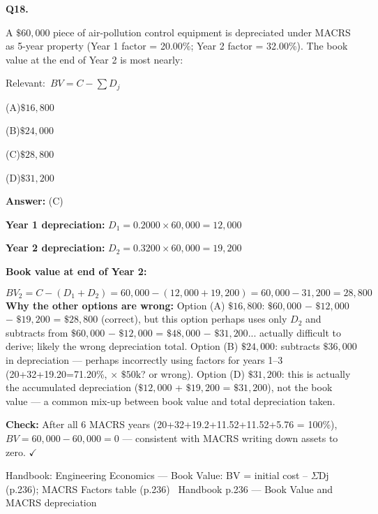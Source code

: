 \documentclass[11pt]{article}
\newcommand{\correct}[1]{\textbf{#1}\;{\color{accent}$\checkmark$}}
\newcommand{\optline}[2]{\par\noindent\hspace{1.2em}(#1)\hspace{0.6em}#2}
\begin{document}
\vspace{9pt}
\filbreak
\textbf{\color{accent}Q18.}\par\vspace{2pt}
A $\$60{,}000$ piece of air-pollution control equipment is depreciated under MACRS as 5-year property (Year 1 factor = 20.00\%; Year 2 factor = 32.00\%). The book value at the end of Year 2 is most nearly:\par\par\vspace{3pt}
{\small\color{soft}Relevant:}\ $BV = C - \sum D_j$\par\vspace{3pt}
\optline{A}{$\$16{,}800$}
\optline{B}{$\$24{,}000$}
\optline{C}{\correct{$\$28{,}800$}}
\optline{D}{$\$31{,}200$}
\par\vspace{3pt}
\vspace{2pt}\par\noindent\colorbox{boxbg}{\parbox{\dimexpr\linewidth-2\fboxsep\relax}{%
\vspace{2pt}\textbf{Answer:} (C)\par\vspace{2pt}
{\small \textbf{Year 1 depreciation:} $D_1 = 0.2000 \times 60{,}000 = 12{,}000$\par
\textbf{Year 2 depreciation:} $D_2 = 0.3200 \times 60{,}000 = 19{,}200$\par
\textbf{Book value at end of Year 2:}\par
\[BV_2 = C - (D_1 + D_2) = 60{,}000 - (12{,}000 + 19{,}200) = 60{,}000 - 31{,}200 = 28{,}800\]
\textbf{Why the other options are wrong:} Option (A) $\$16{,}800$: $\$60{,}000$ $-$ $\$12{,}000$ $-$ $\$19{,}200$ = $\$28{,}800$ (correct), but this option perhaps uses only $D_2$ and subtracts from $\$60{,}000$ $-$ $\$12{,}000$ = $\$48{,}000$ $-$ $\$31{,}200$... actually difficult to derive; likely the wrong depreciation total. Option (B) $\$24{,}000$: subtracts $\$36{,}000$ in depreciation --- perhaps incorrectly using factors for years 1--3 (20+32+19.20=71.20\%, $\times$ $\$50\text{k}$? or wrong). Option (D) $\$31{,}200$: this is actually the accumulated depreciation ($\$12{,}000$ + $\$19{,}200$ = $\$31{,}200$), not the book value --- a common mix-up between book value and total depreciation taken.\par
\textbf{Check:} After all 6 MACRS years (20+32+19.2+11.52+11.52+5.76 = 100\%), $BV = 60{,}000 - 60{,}000 = 0$ --- consistent with MACRS writing down assets to zero. $\checkmark$\par}\par\vspace{2pt}
{\footnotesize\color{soft}Handbook: Engineering Economics --- Book Value: BV = initial cost -- $\Sigma$Dj (p.236); MACRS Factors table (p.236) \textbullet\ Handbook p.236 --- Book Value and MACRS depreciation}\vspace{2pt}
}}
\end{document}
